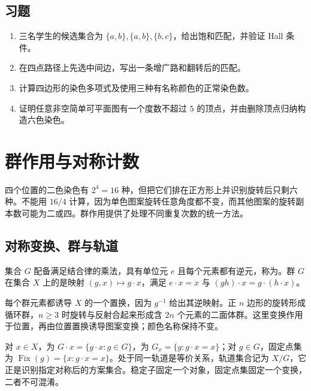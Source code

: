 \documentclass[UTF8,12pt,a4paper,fontset=fandol]{ctexbook}
\begin{document}
\section{习题}
\begin{enumerate}
  \item\label{ex:matching-coloring-1} 三名学生的候选集合为 $\{a,b\},\{a,b\},\{b,c\}$，给出饱和匹配，并验证 Hall 条件。
  \item\label{ex:matching-coloring-2} 在四点路径上先选中间边，写出一条增广路和翻转后的匹配。
  \item\label{ex:matching-coloring-3} 计算四边形的染色多项式及使用三种有名称颜色的正常染色数。
  \item\label{ex:matching-coloring-4} 证明任意非空简单可平面图有一个度数不超过 $5$ 的顶点，并由删除顶点归纳构造六色染色。
\end{enumerate}

\chapter{群作用与对称计数}
\label{ch:symmetry}

四个位置的二色染色有 $2^4=16$ 种，但把它们排在正方形上并识别旋转后只剩六种。不能用 $16/4$ 计算，因为单色图案旋转任意角度都不变，而其他图案的旋转副本数可能为二或四。群作用提供了处理不同重复次数的统一方法。

\section{对称变换、群与轨道}

\begin{definition}
集合 $G$ 配备满足结合律的乘法，具有单位元 $e$ 且每个元素都有逆元，称为。群 $G$ 在集合 $X$ 上的是映射 $(g,x)\mapsto g\cdot x$，满足 $e\cdot x=x$ 与 $(gh)\cdot x=g\cdot(h\cdot x)$。
\end{definition}

每个群元素都诱导 $X$ 的一个置换，因为 $g^{-1}$ 给出其逆映射。正 $n$ 边形的旋转形成循环群，$n\ge3$ 时旋转与反射合起来形成含 $2n$ 个元素的二面体群。这里变换作用于位置，再由位置置换诱导图案变换；颜色名称保持不变。

对 $x\in X$，为 $G\cdot x=\{g\cdot x:g\in G\}$，为 $G_x=\{g:g\cdot x=x\}$；对 $g\in G$，固定点集为 $\operatorname{Fix}(g)=\{x:g\cdot x=x\}$。处于同一轨道是等价关系，轨道集合记为 $X/G$，它正是识别指定对称后的方案集合。稳定子固定一个对象，固定点集固定一个变换，二者不可混淆。
\end{document}
